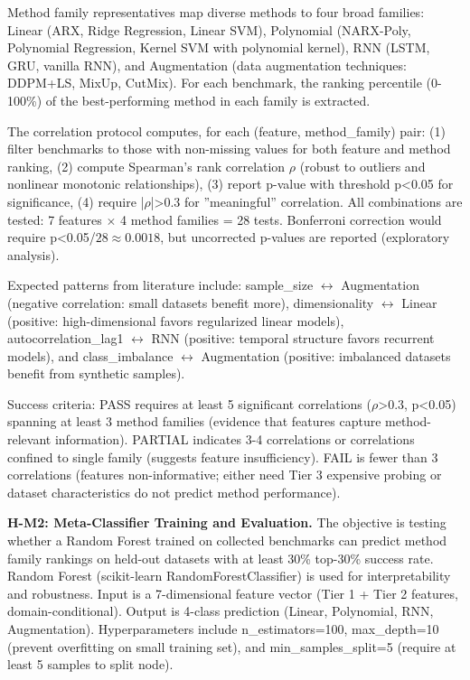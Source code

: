Method family representatives map diverse methods to four broad families: Linear (ARX, Ridge Regression, Linear SVM), Polynomial (NARX-Poly, Polynomial Regression, Kernel SVM with polynomial kernel), RNN (LSTM, GRU, vanilla RNN), and Augmentation (data augmentation techniques: DDPM+LS, MixUp, CutMix). For each benchmark, the ranking percentile (0-100\%) of the best-performing method in each family is extracted.

The correlation protocol computes, for each (feature, method\_family) pair: (1) filter benchmarks to those with non-missing values for both feature and method ranking, (2) compute Spearman's rank correlation $\rho$ (robust to outliers and nonlinear monotonic relationships), (3) report p-value with threshold p<0.05 for significance, (4) require |$\rho$|>0.3 for ''meaningful'' correlation. All combinations are tested: 7 features $\times$ 4 method families = 28 tests. Bonferroni correction would require p<0.05/$28\approx 0.0018$, but uncorrected p-values are reported (exploratory analysis).

Expected patterns from literature include: sample\_size $\leftrightarrow$ Augmentation (negative correlation: small datasets benefit more), dimensionality $\leftrightarrow$ Linear (positive: high-dimensional favors regularized linear models), autocorrelation\_lag1 $\leftrightarrow$ RNN (positive: temporal structure favors recurrent models), and class\_imbalance $\leftrightarrow$ Augmentation (positive: imbalanced datasets benefit from synthetic samples).

Success criteria: PASS requires at least 5 significant correlations ($\rho$>0.3, p<0.05) spanning at least 3 method families (evidence that features capture method-relevant information). PARTIAL indicates 3-4 correlations or correlations confined to single family (suggests feature insufficiency). FAIL is fewer than 3 correlations (features non-informative; either need Tier 3 expensive probing or dataset characteristics do not predict method performance).

\textbf{H-M2: Meta-Classifier Training and Evaluation.} The objective is testing whether a Random Forest trained on collected benchmarks can predict method family rankings on held-out datasets with at least 30\% top-30\% success rate. Random Forest (scikit-learn RandomForestClassifier) is used for interpretability and robustness. Input is a 7-dimensional feature vector (Tier 1 + Tier 2 features, domain-conditional). Output is 4-class prediction (Linear, Polynomial, RNN, Augmentation). Hyperparameters include n\_estimators=100, max\_depth=10 (prevent overfitting on small training set), and min\_samples\_split=5 (require at least 5 samples to split node).

